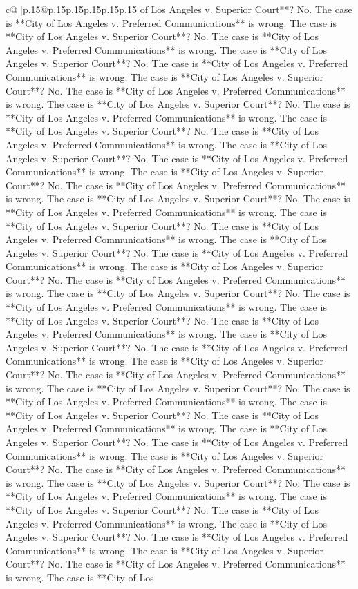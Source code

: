 \documentclass{article}
\begin{document}
{\begin{supertabular}{c@{$\;$}|p{.15\linewidth}@{}p{.15\linewidth}p{.15\linewidth}p{.15\linewidth}p{.15\linewidth}p{.15\linewidth}}
{{{of Los Angeles v. Superior Court**? No. The case is **City of Los Angeles v. Preferred Communications** is wrong. The case is **City of Los Angeles v. Superior Court**? No. The case is **City of Los Angeles v. Preferred Communications** is wrong. The case is **City of Los Angeles v. Superior Court**? No. The case is **City of Los Angeles v. Preferred Communications** is wrong. The case is **City of Los Angeles v. Superior Court**? No. The case is **City of Los Angeles v. Preferred Communications** is wrong. The case is **City of Los Angeles v. Superior Court**? No. The case is **City of Los Angeles v. Preferred Communications** is wrong. The case is **City of Los Angeles v. Superior Court**? No. The case is **City of Los Angeles v. Preferred Communications** is wrong. The case is **City of Los Angeles v. Superior Court**? No. The case is **City of Los Angeles v. Preferred Communications** is wrong. The case is **City of Los Angeles v. Superior Court**? No. The case is **City of Los Angeles v. Preferred Communications** is wrong. The case is **City of Los Angeles v. Superior Court**? No. The case is **City of Los Angeles v. Preferred Communications** is wrong. The case is **City of Los Angeles v. Superior Court**? No. The case is **City of Los Angeles v. Preferred Communications** is wrong. The case is **City of Los Angeles v. Superior Court**? No. The case is **City of Los Angeles v. Preferred Communications** is wrong. The case is **City of Los Angeles v. Superior Court**? No. The case is **City of Los Angeles v. Preferred Communications** is wrong. The case is **City of Los Angeles v. Superior Court**? No. The case is **City of Los Angeles v. Preferred Communications** is wrong. The case is **City of Los Angeles v. Superior Court**? No. The case is **City of Los Angeles v. Preferred Communications** is wrong. The case is **City of Los Angeles v. Superior Court**? No. The case is **City of Los Angeles v. Preferred Communications** is wrong. The case is **City of Los Angeles v. Superior Court**? No. The case is **City of Los Angeles v. Preferred Communications** is wrong. The case is **City of Los Angeles v. Superior Court**? No. The case is **City of Los Angeles v. Preferred Communications** is wrong. The case is **City of Los Angeles v. Superior Court**? No. The case is **City of Los Angeles v. Preferred Communications** is wrong. The case is **City of Los Angeles v. Superior Court**? No. The case is **City of Los Angeles v. Preferred Communications** is wrong. The case is **City of Los Angeles v. Superior Court**? No. The case is **City of Los Angeles v. Preferred Communications** is wrong. The case is **City of Los Angeles v. Superior Court**? No. The case is **City of Los Angeles v. Preferred Communications** is wrong. The case is **City of Los Angeles v. Superior Court**? No. The case is **City of Los Angeles v. Preferred Communications** is wrong. The case is **City of Los Angeles v. Superior Court**? No. The case is **City of Los Angeles v. Preferred Communications** is wrong. The case is **City of Los Angeles v. Superior Court**? No. The case is **City of Los Angeles v. Preferred Communications** is wrong. The case is **City of Los }}}
\end{supertabular}}
\end{document}
